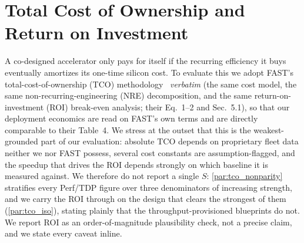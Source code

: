 \section{Total Cost of Ownership and Return on Investment}
\label{sec:tco}


A co-designed accelerator only pays for itself if the recurring efficiency it
buys eventually amortizes its one-time silicon cost. To evaluate this we adopt
FAST's total-cost-of-ownership (TCO) methodology~\citep{zhang_fast}
\emph{verbatim} (the same cost model, the same non-recurring-engineering (NRE)
decomposition, and the same return-on-investment (ROI) break-even analysis;
their Eq.~1--2 and Sec.~5.1), so that our deployment economics are read on
FAST's own terms and are directly comparable to their Table~4. We stress at the
outset that this is the weakest-grounded part of our evaluation: absolute TCO
depends on proprietary fleet data neither we nor FAST possess, several cost
constants are assumption-flagged, and the speedup that drives the ROI depends
strongly on which baseline it is measured against. We therefore do not report a
single $S$: \cref{par:tco_nonparity} stratifies every Perf/TDP figure over three
denominators of increasing strength, and we carry the ROI through on the design
that clears the strongest of them (\cref{par:tco_iso}), stating plainly that the
throughput-provisioned blueprints do not. We report ROI as an order-of-magnitude
plausibility check, not a precise claim, and we state every caveat inline.

